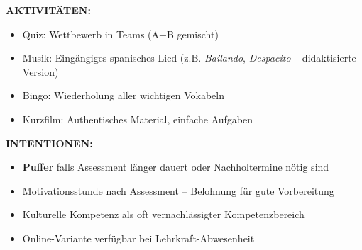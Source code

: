 \documentclass[11pt, a4paper]{article}
\newcommand{\es}[1]{\textcolor{spanisch}{\textit{#1}}}
\begin{document}
\begin{pufferbox}[title={DS 7 -- PUFFER: Cultura y Diversión (Mo, 26.01.2026)}]
\textbf{AKTIVITÄTEN:}
\begin{itemize}[leftmargin=1.5em, nosep]
    \item Quiz: Wettbewerb in Teams (A+B gemischt)
    \item Musik: Eingängiges spanisches Lied (z.B. \es{Bailando}, \es{Despacito} -- didaktisierte Version)
    \item Bingo: Wiederholung aller wichtigen Vokabeln
    \item Kurzfilm: Authentisches Material, einfache Aufgaben
\end{itemize}

\vspace{0.2cm}

\textbf{INTENTIONEN:}
\begin{itemize}[leftmargin=1.5em, nosep]
    \item \textbf{Puffer} falls Assessment länger dauert oder Nachholtermine nötig sind
    \item Motivationsstunde nach Assessment -- Belohnung für gute Vorbereitung
    \item Kulturelle Kompetenz als oft vernachlässigter Kompetenzbereich
    \item Online-Variante verfügbar bei Lehrkraft-Abwesenheit
\end{itemize}

\end{pufferbox}

\vspace{0.5cm}
\end{document}
